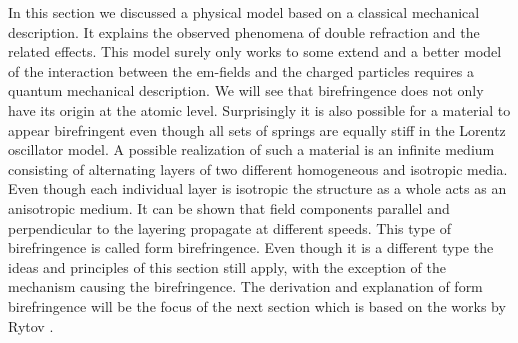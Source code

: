 In this section we discussed a physical model based on a classical mechanical description. It explains the observed phenomena of double refraction and the related effects. This model surely only works to some extend and a better model of the interaction between the em-fields and the charged particles requires a quantum mechanical description. We will see that birefringence does not only have its origin at the atomic level. Surprisingly it is also possible for a material to appear birefringent even though all sets of springs are equally stiff in the Lorentz oscillator model. A possible realization of such a material is an infinite medium consisting of alternating layers of two different homogeneous and isotropic media. Even though each individual layer is isotropic the structure as a whole acts as an anisotropic medium. It can be shown that field components parallel and perpendicular to the layering propagate at different speeds. This type of birefringence is called form birefringence. Even though it is a different type the ideas and principles of this section still apply, with the exception of the mechanism causing the birefringence. The derivation and explanation of form birefringence will be the focus of the next section which is based on the works by Rytov \cite{Rytov1956ElectromagneticMedium}. 

